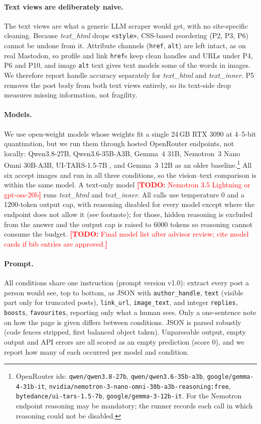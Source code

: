 \documentclass[letterpaper,10pt,twocolumn]{article}
\newcommand{\todo}[1]{\textcolor{red}{\textbf{[TODO:} #1\textbf{]}}}
\begin{document}
\paragraph{Text views are deliberately naive.}
The text views are what a generic LLM scraper would get, with no
site-specific cleaning. Because \textit{text\_html} drops \texttt{<style>},
CSS-based reordering (P2, P3, P6) cannot be undone from it. Attribute channels
(\texttt{href}, \texttt{alt}) are left intact, as on real Mastodon, so profile
and link \texttt{href}s keep clean handles and URLs under P4, P6 and P10, and
image \texttt{alt} text gives text models some of the words in images. We
therefore report handle accuracy separately for \textit{text\_html} and
\textit{text\_inner}. P5 removes the post body from both text views entirely,
so its text-side drop measures missing information, not fragility.

\paragraph{Models.}
We use open-weight models whose weights fit a single 24\,GB RTX 3090 at
4--5-bit quantization, but we run them through hosted OpenRouter endpoints,
not locally: Qwen3.8-27B, Qwen3.6-35B-A3B, Gemma~4 31B, Nemotron~3 Nano Omni
30B-A3B, UI-TARS-1.5-7B \citep{qin2025uitars}, and Gemma~3 12B
\citep{gemmateam2025gemma3} as an older baseline.\footnote{OpenRouter ids:
\texttt{qwen/qwen3.8-27b}, \texttt{qwen/qwen3.6-35b-a3b},
\texttt{google/gemma-4-31b-it},
\texttt{nvidia/nemotron-3-nano-omni-30b-a3b-reasoning:free},
\texttt{bytedance/ui-tars-1.5-7b}, \texttt{google/gemma-3-12b-it}. For the
Nemotron endpoint reasoning may be mandatory; the runner records each call in
which reasoning could not be disabled.} All six
accept images and run in all three conditions, so the vision--text comparison
is within the same model. A text-only model
\todo{Nemotron 3.5 Lightning or gpt-oss-20b} runs \textit{text\_html} and
\textit{text\_inner}. All calls use temperature 0 and a 1200-token output cap,
with reasoning disabled for every model except where the endpoint does not
allow it (see footnote); for those, hidden reasoning is excluded from the
answer and the output cap is raised to 6000 tokens so reasoning cannot
consume the budget.
\todo{Final model list after advisor review; cite model cards if bib entries
are approved.}

\paragraph{Prompt.}
All conditions share one instruction (prompt version v1.0): extract every post
a person would see, top to bottom, as JSON with \texttt{author\_handle},
\texttt{text} (visible part only for truncated posts), \texttt{link\_url},
\texttt{image\_text}, and integer \texttt{replies}, \texttt{boosts},
\texttt{favourites}, reporting only what a human sees. Only a one-sentence note
on how the page is given differs between conditions. JSON is parsed robustly
(code fences stripped, first balanced object taken). Unparseable output, empty
output and API errors are all scored as an empty prediction (score 0), and we
report how many of each occurred per model and condition.
\end{document}
